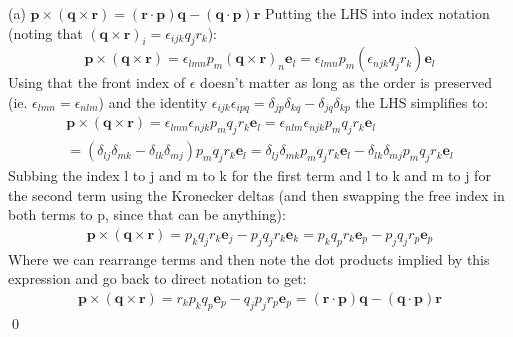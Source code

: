 \medskip
(a) $\bm{p} \times (\bm{q} \times \bm{r}) = (\bm{r} \cdot \bm{p}) \bm{q} - (\bm{q} \cdot \bm{p}) \bm{r}$ \newline
Putting the LHS into index notation (noting that $(\bm{q} \times \bm{r})_i = \epsilon_{ijk}q_jr_k$):
\begin{equation}
    \bm{p} \times (\bm{q} \times \bm{r}) = \epsilon_{lmn}p_m(\bm{q} \times\bm{r})_n \bm{e}_l = \epsilon_{lmn}p_m(\epsilon_{njk}q_jr_k) \bm{e}_l
\end{equation}
Using that the front index of $\epsilon$ doesn't matter as long as the order is preserved (ie. $\epsilon_{lmn} = \epsilon_{nlm}$) and the identity $\epsilon_{ijk}\epsilon_{ipq} = \delta_{jp}\delta_{kq} - \delta_{jq}\delta_{kp}$ the LHS simplifies to:
\begin{equation}
    \begin{split}
    \bm{p} \times (\bm{q} \times \bm{r}) = \epsilon_{lmn}\epsilon_{njk}p_mq_jr_k \bm{e}_l = \epsilon_{nlm}\epsilon_{njk}p_mq_jr_k \bm{e}_l \\
    = (\delta_{lj}\delta_{mk} - \delta_{lk}\delta_{mj})p_mq_jr_k \bm{e}_l = \delta_{lj}\delta_{mk}p_mq_jr_k \bm{e}_l - \delta_{lk}\delta_{mj}p_mq_jr_k \bm{e}_l
    \end{split}
\end{equation}
Subbing the index l to j and m to k for the first term and l to k and m to j for the second term using the Kronecker deltas (and then swapping the free index in both terms to p, since that can be anything):
\begin{equation}
    \begin{split}
    \bm{p} \times (\bm{q} \times \bm{r}) = p_kq_jr_k \bm{e}_j - p_jq_jr_k \bm{e}_k = p_kq_pr_k \bm{e}_p - p_jq_jr_p \bm{e}_p
    \end{split}
\end{equation}
Where we can rearrange terms and then note the dot products implied by this expression and go back to direct notation to get:
\begin{equation}
    \begin{split}
    \bm{p} \times (\bm{q} \times \bm{r}) = r_kp_k q_p\bm{e}_p - q_jp_j r_p\bm{e}_p = (\bm{r} \cdot \bm{p})\bm{q} - (\bm{q} \cdot \bm{p})\bm{r}
    \end{split}
\end{equation} \qed


